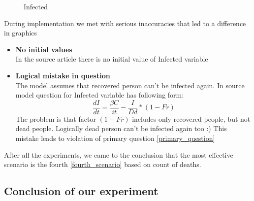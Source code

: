 \documentclass[12pt,a4paper,english]{article}
\begin{document}
    \begin{figure}[H]
        \centering
        \hfill
        \caption{Infected}
    \end{figure}

    During implementation we met with serious inaccuracies that led to a difference in graphics
    \begin{itemize}
        \item \textbf{No initial values}\\ In the source article there is no initial value of Infected variable
        \item \textbf{Logical mistake in question}\\
        The model assumes that recovered person can't be infected again.
        In source model question for Infected variable has following form:
        $$\frac{dI}{dt} = \frac{\beta C}{it} - \frac{I}{Dd} * (1 - Fr)$$
        \noindent The problem is that factor $(1 - Fr)$ includes only recovered people, but not dead people. Logically dead person can't be infected again too :)
        This mistake leads to violation of primary question \eqref{primary_question}
    \end{itemize}

    After all the experiments, we came to the conclusion that the most effective  scenario is the fourth \eqref{fourth_scenario} based on count of deaths.

    \subsection{Conclusion of our experiment}
\end{document}
